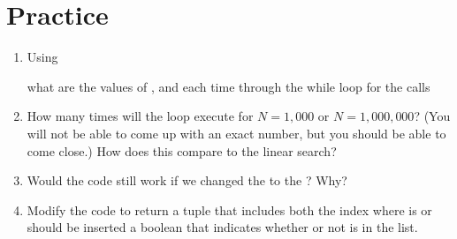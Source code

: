 \documentclass[letterpaper,10pt,english]{sphinxmanual}
\begin{document}
\section{Practice}
\label{\detokenize{lecture_notes/lec20_searching:practice}}\begin{enumerate}
\item {} 
Using

%
\begin{sphinxVerbatim}[commandchars=\\\{\}]
  \PYG{p}{[}        \PYG{p}{]}
\end{sphinxVerbatim}

what are the values of ,  and  each time
through the while loop for the calls

%
\begin{sphinxVerbatim}[commandchars=\\\{\}]
   



   



  




  
\end{sphinxVerbatim}

\item {} 
How many times will the loop execute for \(N = 1,000\) or
\(N = 1,000,000\)? (You will not be able to come up with an exact number,
but you should be able to come close.) How does this compare to the
linear search?

\item {} 
Would the code still work if we changed the \sphinxcode{\sphinxupquote{\textgreater{}}} to the \sphinxcode{\sphinxupquote{\textgreater{}=}}? Why?

\item {} 
Modify the code to return a tuple that includes both the index where
 is or should be inserted  a boolean that indicates
whether or not  is in the list.

\end{enumerate}
\end{document}
